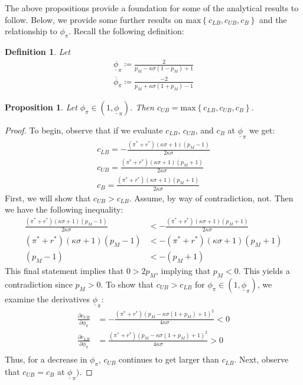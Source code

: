 \documentclass[11pt]{article}
\newtheorem{definition}{Definition}
\newtheorem{proposition}{Proposition}
\begin{document}
\begin{singlespace}
		The above propositions provide a foundation for some of the analytical results to follow. Below, we provide some further results on $\text{max}\left\{c_{LB}, c_{UB}, c_{B}\right\}$ and the relationship to $\phi_{\pi}$. Recall the following definition:
		\begin{definition}
			Let
			\begin{align*}
			\underline{\phi}_{\pi} \coloneqq \frac{2}{p_M - \kappa\sigma(1-p_M) + 1}\\
			\overline{\phi}_{\pi} \coloneqq \frac{-2}{p_M + \kappa\sigma(1+p_M) - 1}
			\end{align*}
		\end{definition}
		\begin{proposition}\label{prop:cPHIpiub}
			Let $\phi_{\pi}\in(1,\underline{\phi}_{\pi})$. Then $c_{UB} = \text{max}\left\{c_{LB}, c_{UB}, c_{B}\right\}$. 
		\end{proposition}
		\begin{proof}
			To begin, observe that if we evaluate $c_{LB}$, $c_{UB}$, and $c_{B}$ at $\underline{\phi}_{\pi}$ we get:
			\begin{align*}
			c_{LB} = -\frac{(\pi^* + r^*)(\kappa\sigma + 1)(p_M -1)}{2\kappa\sigma}\\
			c_{UB} =\frac{(\pi^* + r^*)(\kappa\sigma + 1)(p_M +1)}{2\kappa\sigma}\\
			c_{B} = \frac{(\pi^* + r^*)(\kappa\sigma + 1)(p_M +1)}{2\kappa\sigma}
			\end{align*}
			First, we will show that $c_{UB} > c_{LB}$. 
			Assume, by way of contradiction, not.  Then we have the following inequality: 
			\begin{align*}
			\frac{(\pi^* + r^*)(\kappa\sigma + 1)(p_M -1)}{2\kappa\sigma} &< -\frac{(\pi^* + r^*)(\kappa\sigma + 1)(p_M +1)}{2\kappa\sigma}\\
			(\pi^* + r^*)(\kappa\sigma + 1)(p_M -1) &< -(\pi^* + r^*)(\kappa\sigma + 1)(p_M +1)\\
			(p_M -1) &< -(p_M +1)
			\end{align*}
			This final statement implies that $0>2p_M$, implying that $p_M<0$. This yields a contradiction since $p_M>0$. To show that  $c_{UB} > c_{LB}$ for $\phi_{\pi}\in(1,\underline{\phi}_{\pi})$, we examine the derivatives $\underline{\phi}_{\pi}$: 
			\begin{align*}
			\frac{\partial c_{UB}}{\partial \phi_{\pi}} &= -\frac{(\pi^* + r^*)(p_M-\kappa\sigma(1+p_M)+1)^2}{4\kappa\sigma} < 0\\
			\frac{\partial c_{LB}}{\partial \phi_{\pi}} &= \frac{(\pi^* + r^*)(p_M-\kappa\sigma(1+p_M)+1)^2}{4\kappa\sigma} > 0\\
			\end{align*}
			Thus, for a decrease in  $\phi_{\pi}$, $c_{UB}$ continues to get larger than $c_{LB}$. 
			Next, observe that $c_{UB} = c_{B}$ at $\underline{\phi}_{\pi})$. 
			

\end{proof}
\end{singlespace}
\end{document}
